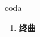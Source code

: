 
\begin{frame}
{\huge coda}
\begin{center}
\begin{enumerate}\Large
  \item \textbf{终曲}
\end{enumerate}
\end{center}
\end{frame}
